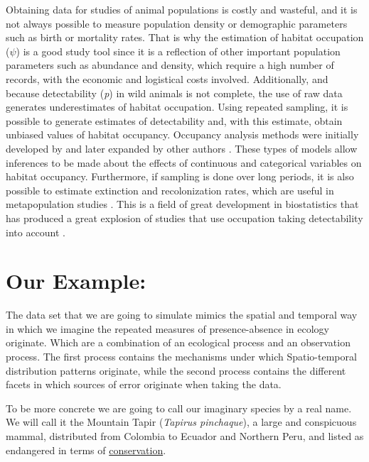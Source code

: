 \documentclass[
]{book}
\begin{document}
Obtaining data for studies of animal populations is costly and wasteful, and it is not always possible to measure population density or demographic parameters such as birth or mortality rates. That is why the estimation of habitat occupation (\(\psi\)) is a good study tool since it is a reflection of other important population parameters such as abundance and density, which require a high number of records, with the economic and logistical costs involved. Additionally, and because detectability (\emph{p}) in wild animals is not complete, the use of raw data generates underestimates of habitat occupation. Using repeated sampling, it is possible to generate estimates of detectability and, with this estimate, obtain unbiased values of habitat occupancy. Occupancy analysis methods were initially developed by \citep{MacKenzie2002} and later expanded by other authors \citep{MACKENZIE2005, MacKenzie2006, Kery2008, Royle2007a, Royle2005, Royle2006}. These types of models allow inferences to be made about the effects of continuous and categorical variables on habitat occupancy. Furthermore, if sampling is done over long periods, it is also possible to estimate extinction and recolonization rates, which are useful in metapopulation studies \citep{MacKenzie2003}. This is a field of great development in biostatistics that has produced a great explosion of studies that use occupation taking detectability into account \citep{Guillera-Arroita2010a, Guillera-Arroita2015, Guillera-Arroita2011, Guillera-Arroita2012, Guillera-Arroita2014a, Kery2013}.

\hypertarget{example}{%
\chapter{Our Example:}\label{example}}

The data set that we are going to simulate mimics the spatial and temporal way in which we imagine the repeated measures of presence-absence in ecology originate. Which are a combination of an ecological process and an observation process. The first process contains the mechanisms under which Spatio-temporal distribution patterns originate, while the second process contains the different facets in which sources of error originate when taking the data.

To be more concrete we are going to call our imaginary species by a real name. We will call it the Mountain Tapir (\emph{Tapirus pinchaque}), a large and conspicuous mammal, distributed from Colombia to Ecuador and Northern Peru, and listed as endangered in terms of \href{https://www.iucnredlist.org/species/21473/45173922}{conservation}.
\end{document}
